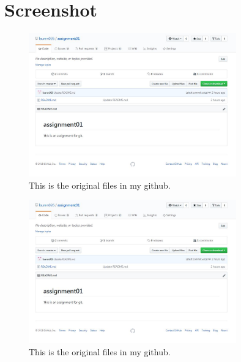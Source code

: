 \documentclass[a4paper]{article}
\begin{document}
\section{Screenshot}

\begin{figure}
\begin{center}
	\includegraphics[width=0.8\textwidth]{screenshot01.JPG}
	\caption{\label{fig:screenshot01} This is the original files in my github.}
\end{center}
\end{figure}

\begin{figure}
\begin{center}
	\includegraphics[width=0.8\textwidth]{screenshot01.JPG}
	\caption{\label{fig:screenshot01} This is the original files in my github.}
\end{center}
\end{figure}
\end{document}
